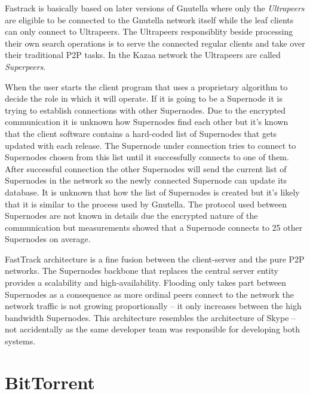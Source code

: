\documentclass[a4paper]{article}
\begin{document}
Fastrack is basically based on later versions of Gnutella where only the \emph{Ultrapeers} are eligible to be connected
to the Gnutella network itself while the leaf clients can only connect to Ultrapeers. The Ultrapeers responsiblity
beside processing their own search operations is to serve the connected regular clients and take over their traditional
P2P tasks. In the Kazaa network the Ultrapeers are called \emph{Superpeers}.

When the user starts the client program that uses a proprietary algorithm to decide the role in which it will operate.
If it is going to be a Supernode it is trying to establish connections with other Supernodes. Due to the encrypted
communication it is unknown how Supernodes find each other but it's known that the client software contains a
hard-coded list of Supernodes that gets updated with each release. The Supernode under connection tries to connect to
Supernodes chosen from this list until it successfully connects to one of them. After successful connection the other
Supernodes will send the current list of Supernodes in the network so the newly connected Supernode can update its
database. It is unknown that how the list of Supernodes is created but it's likely that it is similar to the process
used by Gnutella. The protocol used between Supernodes are not known in details due the encrypted nature of the
communication but measurements showed that a Supernode connects to 25 other Supernodes on average.

FastTrack architecture is a fine fusion between the client-server and the pure P2P networks. The Supernodes backbone
that replaces the central server entity provides a scalability and high-availability. Flooding only takes part between
Supernodes as a consequence as more ordinal peers connect to the network the network traffic is not growing
proportionally -- it only increases between the high bandwidth Supernodes. This architecture resembles the architecture
of Skype -- not accidentally as the same developer team was responsible for developing both systems.

\section{BitTorrent}
\end{document}
